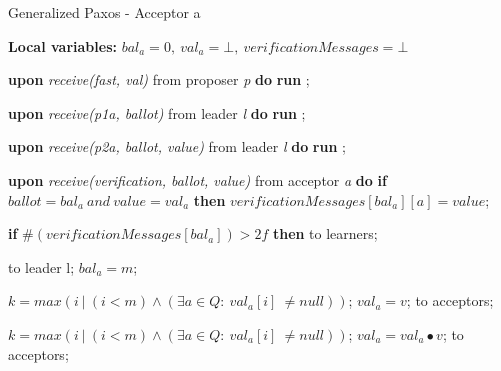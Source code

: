 \begin{algorithm}
	\caption{Generalized Paxos - Acceptor a}
	\textbf{Local variables: } $bal_a = 0,\ val_a = \bot,\ verificationMessages = \bot$ 
	\begin{algorithmic}[1]
		
		\State \textbf{upon} \textit{receive(fast, val)} from proposer \textit{p} \textbf{do}
		\State \hspace{\algorithmicindent} \textbf{run} ;
		
		\State
		\State \textbf{upon} \textit{receive(p1a, ballot)} from leader \textit{l} \textbf{do}
		\State \hspace{\algorithmicindent} \textbf{run} ;
		
		\State
		\State \textbf{upon} \textit{receive(p2a, ballot, value)} from leader \textit{l} \textbf{do}
		\State \hspace{\algorithmicindent} \textbf{run} ;
		
		\State 
		\State \textbf{upon} \textit{receive(verification, ballot, value)} from acceptor \textit{a} \textbf{do}
		\State \hspace{\algorithmicindent}\textbf{if} $ballot = bal_a\ and \ value  = val_a$ \textbf{then}
		\State \hspace{\algorithmicindent}\hspace{\algorithmicindent} $verificationMessages[bal_a][a] = value$;
		
		\State \hspace{\algorithmicindent}\hspace{\algorithmicindent} \textbf{if} $\#(verificationMessages[bal_a]) > 2f$ \textbf{then}
		\State \hspace{\algorithmicindent}\hspace{\algorithmicindent} \hspace{\algorithmicindent}  to learners;
		
		\State
		\State {} to leader l;
		\State $bal_a = m$;
		\EndIf
		\EndFunction
		
		\State
		\State $k = max(i\ |\ (i < m) \wedge (\exists a \in Q :\ val_a[i]\ \neq null))$;
		\State $val_a = v$;
		\State {} to acceptors;
		\EndIf
		\EndFunction
		
		\State
		\State $k = max(i\ |\ (i < m) \wedge (\exists a \in Q :\ val_a[i]\ \neq null))$;
		\State $val_a = val_a \bullet v$;
		\State {} to acceptors;
		\EndIf
		\EndFunction
		
	\end{algorithmic}
\end{algorithm}

